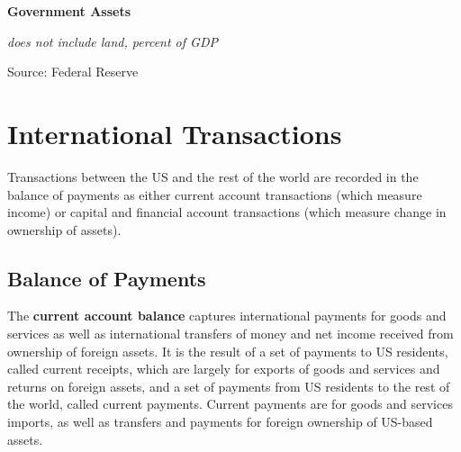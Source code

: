 \documentclass{report}
\makeatletter
\newcommand{\tbllink}[1]{\href{https://raw.githubusercontent.com/bdecon/US-chartbook/master/chartbook/data/#1}{\faTable}}
\newcommand*\short[1]{\expandafter\@gobbletwo\number\numexpr#1\relax}
\newcommand{\sbar}[4]{
		\addplot[ybar stacked, bar width=2.6pt, draw opacity=0, fill=#1] 
			table [x=#2, y=#3, col sep=comma]{#4};}
\newcommand{\dateaxisticks}{
		date coordinates in=x, axis line style={draw=none},
		xmax={2020-08-10},
		max space between ticks=40,	    
		xtick={{1990-01-01}, {1992-01-01}, {1994-01-01}, 
			{1996-01-01}, {1998-01-01}, {2000-01-01}, 
			{2002-01-01}, {2004-01-01}, {2006-01-01},
			{2008-01-01}, {2010-01-01}, {2012-01-01}, {2014-01-01},
		    {2016-01-01}, {2018-01-01}, {2020-01-01}},
		minor xtick={{1989-01-01}, {1991-01-01}, {1993-01-01},
			{1995-01-01}, {1997-01-01}, {1999-01-01}, 
			{2001-01-01}, {2003-01-01}, {2005-01-01}, {2007-01-01},
		    {2009-01-01}, {2011-01-01}, {2013-01-01}, {2015-01-01},
		    {2017-01-01}, {2019-01-01}},
		enlarge y limits={0.06}, enlarge x limits={0.01},
		}
\newcommand{\bbar}[2]{extra #1 ticks = {{#2}}, extra #1 tick labels = ,
		extra #1 tick style = {grid=major, grid style={thick, black!25}},}
\newcommand{\rbars}{
		\fill[color=black!10] (axis cs:{1990-07-01},\pgfkeysvalueof{/pgfplots/ymin}) rectangle 
			(axis cs:{1991-03-01}, \pgfkeysvalueof{/pgfplots/ymax});
		\fill[color=black!10] (axis cs:{2007-12-01},\pgfkeysvalueof{/pgfplots/ymin}) rectangle 
			(axis cs:{2009-07-01}, \pgfkeysvalueof{/pgfplots/ymax});
		\fill[color=black!10] (axis cs:{2001-03-01},\pgfkeysvalueof{/pgfplots/ymin}) rectangle 
			(axis cs:{2001-11-01}, \pgfkeysvalueof{/pgfplots/ymax});
		\fill[color=black!10] (axis cs:{2020-02-01},\pgfkeysvalueof{/pgfplots/ymin}) rectangle 
			(axis cs:{2020-09-01}, \pgfkeysvalueof{/pgfplots/ymax});}
\makeatother
\begin{document}
{{{{{\begin{minipage}{0.76\textwidth}


\vspace{4mm}

\normalsize \textbf{Government Assets}

\footnotesize{\textit{does not include land, percent of GDP}}

\hspace*{-2mm} 

\footnotesize{Source: Federal Reserve} \hfill \tbllink{govassets.csv}
\end{minipage}

\newpage
\begin{minipage}{0.76\textwidth}
\section*{\color{darkgray}\LARGE International Transactions}
\label{sec:ext}
\small Transactions between the US and the rest of the world are recorded in the balance of payments as either current account transactions (which measure income) or capital and financial account transactions (which measure change in ownership of assets). 

\subsection*{\color{black!70} \seriffont Balance of Payments}
\small The \textbf{current account balance} captures international payments for goods and services as well as international transfers of money and net income received from ownership of foreign assets. It is the result of a set of payments to US residents, called current receipts, which are largely for exports of goods and services and returns on foreign assets, and a set of payments from US residents to the rest of the world, called current payments. Current payments are for goods and services imports, as well as transfers and payments for foreign ownership of US-based assets.\\


\end{minipage}}}}}}
\end{document}
